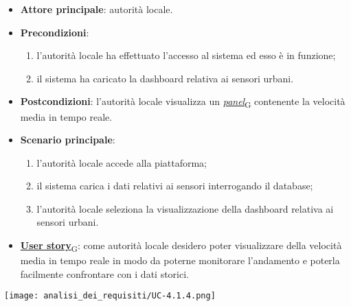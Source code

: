 \begin{itemize}
	\item \textbf{Attore principale}: autorità locale.
	\item \textbf{Precondizioni}:
	      \begin{enumerate}
		      \item l'autorità locale ha effettuato l'accesso al sistema ed esso è in funzione;
		      \item il sistema ha caricato la dashboard relativa ai sensori urbani.
	      \end{enumerate}
	\item \textbf{Postcondizioni}: l'autorità locale visualizza un \href{https://7last.github.io/docs/pb/documentazione-interna/glossario\#panel}{\textit{panel}\textsubscript{G}} contenente la velocità media in tempo reale.
	\item \textbf{Scenario principale}:
	      \begin{enumerate}
		      \item l'autorità locale accede alla piattaforma;
		      \item il sistema carica i dati relativi ai sensori interrogando il database;
		      \item l'autorità locale seleziona la visualizzazione della dashboard relativa ai sensori urbani.
	      \end{enumerate}
	\item \href{https://7last.github.io/docs/pb/documentazione-interna/glossario\#user-story}{\textbf{User story}\textsubscript{G}}:
	      come autorità locale desidero poter visualizzare della velocità media in tempo reale in modo da poterne monitorare l'andamento
	      e poterla facilmente confrontare con i dati storici.
\end{itemize}
\begin{center}
	\texttt{[image: analisi\_dei\_requisiti/UC-4.1.4.png]}
\end{center}


